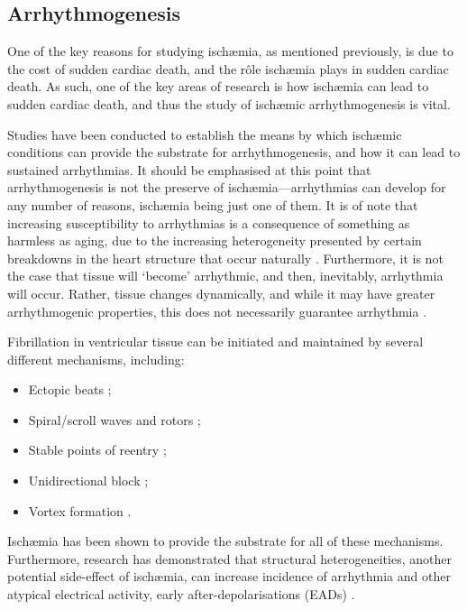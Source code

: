 \documentclass[../thesis-main.tex]{subfiles}
\begin{document}
 \subsection{Arrhythmogenesis}
 \label{subsec:arrhythmogenesis}
 One of the key reasons for studying isch\ae{}mia, as mentioned previously, is due to the cost of sudden cardiac death, and the r\^ole isch\ae{}mia plays in sudden cardiac death. As such, one of the key areas of research is how isch\ae{}mia can lead to sudden cardiac death, and thus the study of isch\ae{}mic arrhythmogenesis is vital.
 
 Studies have been conducted to establish the means by which isch\ae{}mic conditions can provide the substrate for arrhythmogenesis, and how it can lead to sustained arrhythmias. It should be emphasised at this point that arrhythmogenesis is not the preserve of isch\ae{}mia---arrhythmias can develop for any number of reasons, isch\ae{}mia being just one of them. It is of note that increasing susceptibility to arrhythmias is a consequence of something as harmless as aging, due to the increasing heterogeneity presented by certain breakdowns in the heart structure that occur naturally \citep{Spach1988}. Furthermore, it is not the case that tissue will `become' arrhythmic, and then, inevitably, arrhythmia will occur. Rather, tissue changes dynamically, and while it may have greater arrhythmogenic properties, this does not necessarily guarantee arrhythmia \citep{Weiss2006}.
 
 Fibrillation in ventricular tissue can be initiated and maintained by several different mechanisms, including:
 \begin{itemize}
  \item Ectopic beats \citep{Haissaguerre1998, Tobon2010, Zhang2011};
  \item Spiral/scroll waves and rotors \citep{Jalife2003, Jalife2009, Pandit2013};
  \item Stable points of reentry \citep{Mandapati2000, Allessie1977};
  \item Unidirectional block \citep{Allessie1976, Gough1985};
  \item Vortex formation \citep{Cabo1996}.
 \end{itemize}
 Isch\ae{}mia has been shown to provide the substrate for all of these mechanisms. Furthermore, research has demonstrated that structural heterogeneities, another potential side-effect of isch\ae{}mia, can increase incidence of arrhythmia and other atypical electrical activity, \eg{} early after-depolarisations (EADs) \citep{Auerbach2011}.
 
\end{document}
